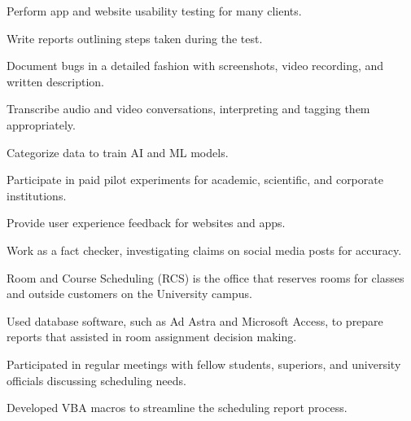 \documentclass[]{deedy-resume-openfont}
\begin{document}
\begin{tightemize}
\item Perform app and website usability testing for many clients.
\item Write reports outlining steps taken during the test.
\item Document bugs in a detailed fashion with screenshots, video recording, and written description.
\end{tightemize}
\sectionsep

\begin{tightemize}
\item Transcribe audio and video conversations, interpreting and tagging them appropriately.
\item Categorize data to train AI and ML models.
\item Participate in paid pilot experiments for academic, scientific, and corporate institutions.
\item Provide user experience feedback for websites and apps.
\item Work as a fact checker, investigating claims on social media posts for accuracy.
\end{tightemize}
\sectionsep

\begin{tightemize}
\item Room and Course Scheduling (RCS) is the office that reserves rooms for classes and outside customers on the University campus.
\item Used database software, such as Ad Astra and Microsoft Access, to prepare reports that assisted in room assignment decision making.
\item Participated in regular meetings with fellow students, superiors, and university officials discussing scheduling needs.
\item Developed VBA macros to streamline the scheduling report process.
\end{tightemize}
\sectionsep

\newpage
\end{document}
